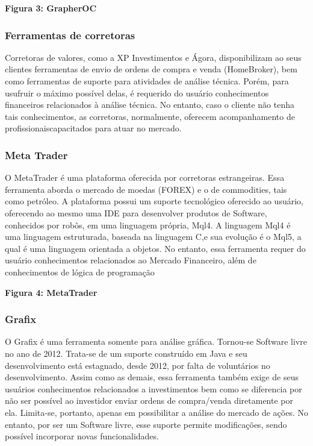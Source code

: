 \textbf{Figura 3: GrapherOC}

\subsubsection{Ferramentas de corretoras}

Corretoras de valores, como a XP Investimentos e Ágora, disponibilizam ao seus clientes ferramentas de envio de ordens de compra e venda (HomeBroker), bem como ferramentas de suporte para atividades de análise técnica. Porém, para usufruir o máximo possível delas, é requerido do usuário conhecimentos financeiros relacionados à análise técnica. No entanto, caso o cliente não tenha tais conhecimentos, as corretoras, normalmente, oferecem acompanhamento de profissionaiscapacitados para atuar no mercado.

\subsubsection{Meta Trader}

O MetaTrader é uma plataforma oferecida por corretoras estrangeiras. Essa ferramenta aborda o mercado de moedas (FOREX) e o de commodities, tais como petróleo. A plataforma possui um suporte tecnológico oferecido ao usuário, oferecendo ao mesmo uma IDE para desenvolver produtos de Software, conhecidos por robôs, em uma linguagem própria, Mql4. A linguagem Mql4 é uma linguagem estruturada, baseada na linguagem C,e sua evolução é o Mql5, a qual é uma linguagem orientada a objetos. No entanto, essa ferramenta requer do usuário conhecimentos relacionados ao Mercado Financeiro, além de conhecimentos de lógica de programação

\textbf{Figura 4: MetaTrader}

\subsubsection{Grafix}

O Grafix é uma ferramenta somente para análise gráfica. Tornou-se Software livre no ano de 2012. Trata-se de um suporte construído em Java e seu desenvolvimento está estagnado, desde 2012, por falta de voluntários no desenvolvimento. Assim como as demais, essa ferramenta também exige de seus usuários conhecimentos relacionados a investimentos bem como se diferencia por não ser possível ao investidor enviar ordens de compra/venda diretamente por ela. Limita-se, portanto, apenas em possibilitar a análise do mercado de ações. No entanto, por ser um Software livre, esse suporte permite modificações, sendo possível incorporar novas funcionalidades.

